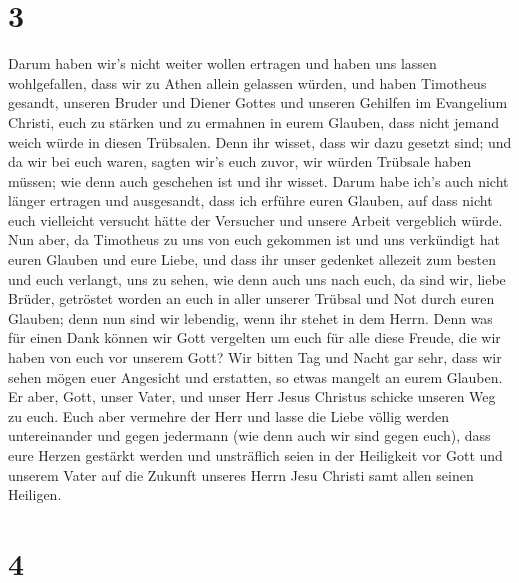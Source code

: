 \hypertarget{section-2}{%
\section{3}\label{section-2}}

 Darum haben wir's nicht weiter wollen ertragen und haben
uns lassen wohlgefallen, dass wir zu Athen allein gelassen würden,
 und haben Timotheus gesandt, unseren Bruder und Diener
Gottes und unseren Gehilfen im Evangelium Christi, euch zu stärken und
zu ermahnen in eurem Glauben,  dass nicht jemand weich
würde in diesen Trübsalen. Denn ihr wisset, dass wir dazu gesetzt sind;
 und da wir bei euch waren, sagten wir's euch zuvor, wir
würden Trübsale haben müssen; wie denn auch geschehen ist und ihr
wisset.  Darum habe ich's auch nicht länger ertragen und
ausgesandt, dass ich erführe euren Glauben, auf dass nicht euch
vielleicht versucht hätte der Versucher und unsere Arbeit vergeblich
würde.  Nun aber, da Timotheus zu uns von euch gekommen
ist und uns verkündigt hat euren Glauben und eure Liebe, und dass ihr
unser gedenket allezeit zum besten und euch verlangt, uns zu sehen, wie
denn auch uns nach euch,  da sind wir, liebe Brüder,
getröstet worden an euch in aller unserer Trübsal und Not durch euren
Glauben;  denn nun sind wir lebendig, wenn ihr stehet in
dem Herrn.  Denn was für einen Dank können wir Gott
vergelten um euch für alle diese Freude, die wir haben von euch vor
unserem Gott?  Wir bitten Tag und Nacht gar sehr, dass
wir sehen mögen euer Angesicht und erstatten, so etwas mangelt an eurem
Glauben.  Er aber, Gott, unser Vater, und unser Herr
Jesus Christus schicke unseren Weg zu euch.  Euch aber
vermehre der Herr und lasse die Liebe völlig werden untereinander und
gegen jedermann (wie denn auch wir sind gegen euch), 
dass eure Herzen gestärkt werden und unsträflich seien in der Heiligkeit
vor Gott und unserem Vater auf die Zukunft unseres Herrn Jesu Christi
samt allen seinen Heiligen.

\hypertarget{section-3}{%
\section{4}\label{section-3}}

